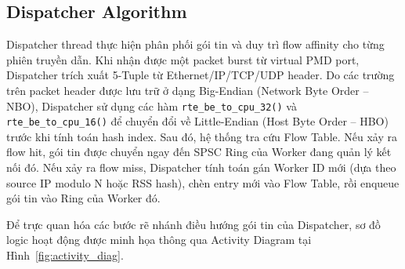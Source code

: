 \documentclass[12pt,a4paper,twoside]{report}
\begin{document}
\subsection{Dispatcher Algorithm}
Dispatcher thread thực hiện phân phối gói tin và duy trì flow affinity cho từng phiên truyền dẫn. Khi nhận được một packet burst từ virtual PMD port, Dispatcher trích xuất 5-Tuple từ Ethernet/IP/TCP/UDP header. Do các trường trên packet header được lưu trữ ở dạng Big-Endian (Network Byte Order -- NBO), Dispatcher sử dụng các hàm \texttt{rte\_be\_to\_cpu\_32()} và \texttt{rte\_be\_to\_cpu\_16()} để chuyển đổi về Little-Endian (Host Byte Order -- HBO) trước khi tính toán hash index. Sau đó, hệ thống tra cứu Flow Table. Nếu xảy ra flow hit, gói tin được chuyển ngay đến SPSC Ring của Worker đang quản lý kết nối đó. Nếu xảy ra flow miss, Dispatcher tính toán gán Worker ID mới (dựa theo source IP modulo N hoặc RSS hash), chèn entry mới vào Flow Table, rồi enqueue gói tin vào Ring của Worker đó.

Để trực quan hóa các bước rẽ nhánh điều hướng gói tin của Dispatcher, sơ đồ logic hoạt động được minh họa thông qua Activity Diagram tại Hình~\ref{fig:activity_diag}.
\end{document}
